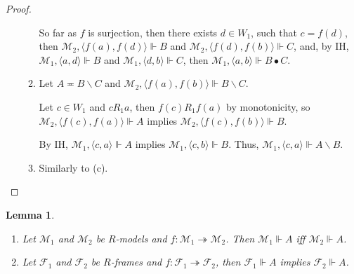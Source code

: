 \documentclass[a4paper]{article}
\theoremstyle{defin}
\theoremstyle{theorem}
\theoremstyle{prop}
\theoremstyle{lemma}
\newtheorem{lemma}{Lemma}
\theoremstyle{ex}
\theoremstyle{col}
\begin{document}
\begin{proof}
\begin{enumerate}
\begin{enumerate}
      So far as $f$ is surjection, then there exists $d \in W_1$, such that
      $c = f(d)$, then $\mathcal{M}_2, \langle f(a), f(d) \rangle \Vdash B$ and
      $\mathcal{M}_2, \langle f(d), f(b) \rangle \Vdash C$, and, by IH,
      $\mathcal{M}_1, \langle a, d \rangle \Vdash B$ and $\mathcal{M}_1, \langle d, b \rangle \Vdash C$,
      then $\mathcal{M}_1, \langle a, b \rangle \Vdash B \bullet C$.

      \item Let $A \eqcirc B \backslash C$ and $\mathcal{M}_2, \langle f(a), f(b) \rangle \Vdash B \backslash C$.

      Let $c \in W_1$ and $c R_1 a$, then $f(c) R_1 f(a)$ by monotonicity,
      so $\mathcal{M}_2, \langle f(c), f(a) \rangle \Vdash A$ implies
      $\mathcal{M}_2, \langle f(c), f(b) \rangle \Vdash B$.

      By IH, $\mathcal{M}_1, \langle c, a \rangle \Vdash A$ implies
      $\mathcal{M}_1, \langle c, b \rangle \Vdash B$. Thus, $\mathcal{M}_1, \langle c, a \rangle \Vdash A \backslash B$.
      \item Similarly to (c).
    \end{enumerate}
  \end{enumerate}
\end{proof}

\begin{lemma}
$ $

  \begin{enumerate}
    \item Let $\mathcal{M}_1$ and $\mathcal{M}_2$ be $R$-models and $f : \mathcal{M}_1 \twoheadrightarrow \mathcal{M}_2$.
    Then $\mathcal{M}_1 \Vdash A$ iff $\mathcal{M}_2 \Vdash A$.

    \item Let $\mathcal{F}_1$ and $\mathcal{F}_2$ be $R$-frames and $f : \mathcal{F}_1 \twoheadrightarrow \mathcal{F}_2$,
    then $\mathcal{F}_1 \Vdash A$ implies $\mathcal{F}_2 \Vdash A$.
  \end{enumerate}
\end{lemma}
\end{document}
